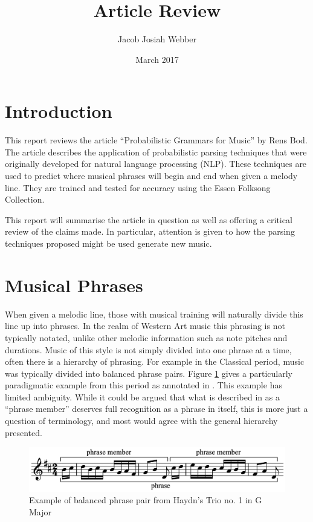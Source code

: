 \documentclass[a4paper,12pt]{article}
\title{Article Review}
\author{Jacob Josiah Webber}
\date{March 2017}
\begin{document}
\maketitle

\section{Introduction}
This report reviews the article ``Probabilistic Grammars for Music'' \cite{Bod_probabilisticgrammars} by Rens Bod. The article describes the application of probabilistic parsing techniques that were originally developed for natural language processing (NLP). These techniques are used to predict where musical phrases will begin and end when given a melody line. They are trained and tested for accuracy using the Essen Folksong Collection.

This report will summarise the article in question as well as offering a critical review of the claims made. In particular, attention is given to how the parsing techniques proposed might be used generate new music.

\section{Musical Phrases}
When given a melodic line, those with musical training will naturally divide this line up into phrases. In the realm of Western Art music this phrasing is not typically notated, unlike other melodic information such as note pitches and durations. Music of this style is not simply divided into one phrase at a time, often there is a hierarchy of phrasing. For example in the Classical period, music was typically divided into balanced phrase pairs. Figure \ref{haydn} gives a particularly paradigmatic example from this period as annotated in \cite{music-theory}. This example has limited ambiguity. While it could be argued that what is described in \cite{music-theory} as a ``phrase member'' deserves full recognition as a phrase in itself, this is more just a question of terminology, and most would agree with the general hierarchy presented.

\begin{figure}
\centering
\includegraphics[width=\textwidth]{diagrams/Haydn}
\caption{Example of balanced phrase pair from  Haydn's Trio no. 1 in G Major}
\label{haydn}
\end{figure}
\end{document}
